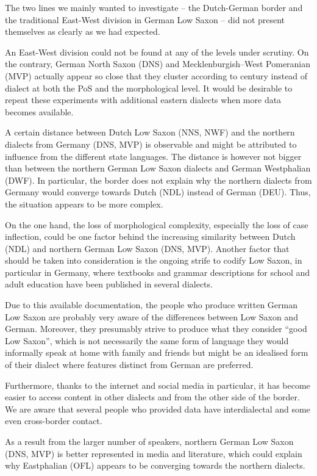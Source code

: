 \documentclass[output=paper,colorlinks,citecolor=brown]{langscibook}
\begin{document}
The two lines we mainly wanted to investigate -- the Dutch-German border and the traditional East-West division in German Low Saxon -- did not present themselves as clearly as we had expected. 

An East-West division could not be found at any of the levels under scrutiny. On the contrary, German North Saxon (DNS) and Mecklenburgish--West Pomeranian (MVP) actually appear so close that they cluster according to century instead of dialect at both the PoS and the morphological level. It would be desirable to repeat these experiments with additional eastern dialects when more data becomes available. 

A certain distance between Dutch Low Saxon (NNS, NWF) and the northern dialects from Germany (DNS, MVP) is observable and might be attributed to influence from the different state languages. The distance is however not bigger than between the northern German Low Saxon dialects and German Westphalian (DWF). In particular, the border does not explain why the northern dialects from Germany would converge towards Dutch (NDL) instead of German (DEU). Thus, the situation appears to be more complex.  

On the one hand, the loss of morphological complexity, especially the loss of case inflection, could be one factor behind the increasing similarity between Dutch (NDL) and northern German Low Saxon (DNS, MVP).
Another factor that should be taken into consideration is the ongoing strife to codify Low Saxon, in particular in Germany, where textbooks and grammar descriptions for school and adult education have been published in several dialects.

Due to this available documentation, the people who produce written German Low Saxon are probably very aware of the differences between Low Saxon and German. Moreover, they presumably strive to produce what they consider “good Low Saxon”, which is not necessarily the same form of language they would informally speak at home with family and friends but might be an idealised form of their dialect where features distinct from German are preferred. 

Furthermore, thanks to the internet and social media in particular, it has become easier to access content in other dialects and from the other side of the border. We are aware that several people who provided data have interdialectal and some even cross-border contact. 

As a result from the larger number of speakers, northern German Low Saxon (DNS, MVP) is better represented in media and literature, which could explain why Eastphalian (OFL) appears to be converging towards the northern dialects.  
\end{document}
